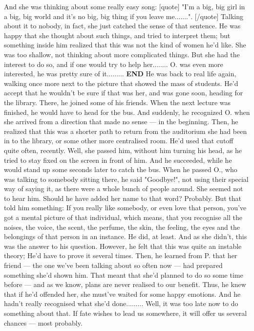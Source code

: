And she was thinking about some really easy song: 
[quote]
"I'm a big, big girl in a big, big world and it's no big, big thing if you leave me.......". 
[/quote]
Talking about it to nobody, in fact, she just catched the sense of that sentence. 
He was happy that she thought about such things, and tried to interpret them; but something inside him realized that this was not the kind of women he'd like. She was too shallow, not thinking about more complicated things. But she had the interest to do so, and if one would try to help her........
O. was even more interested, he was pretty sure of it.........
\textbf{END}
He was back to real life again, walking once more next to the picture that showed the mass of students. 
He'd accept that he wouldn't be sure if that was her, and was gone soon, heading for the library. There, he joined some of his friends. 
When the next lecture was finished, he would have to head for the bus. 
And suddenly, he recognized O. when she arrived from a direction that made no sense --- in the beginning. Then, he realized that this was a shorter path to return from the auditorium she had been in to the library, or some other more centralised room. 
He'd used that cutoff quite often, recently. 
Well, she passed him, without him turning his head, as he tried to stay fixed on the screen in front of him. 
And he succeeded, while he would stand up some seconds later to catch the bus. When he passed O., who was talking to somebody sitting there, he said "Goodbye!", not using their special way of saying it, as there were a whole bunch of people around. 
She seemed not to hear him. 
Should he have added her name to that word?
Probably. But that told him something: If you really like somebody, or even love that person, you've got a mental picture of that individual, which means, that you recognise all the noises, the voice, the scent, the perfume, the skin, the feeling, the eyes and the belongings of that person in an instance. 
He did, at least. 
And as she didn't, this was the answer to his question. 
However, he felt that this was quite an instable theory; He'd have to prove it several times. 
Then, he learned from P. that her friend --- the one we've been talking about so often now --- had prepared something she'd shown him. That meant that she'd planned to do so some time before --- and as we know, plans are never realised to our benefit. 
Thus, he knew that if he'd offended her, she must've waited for some happy emotions. And he hadn't really recognised what she'd done.........
Well, it was too late now to do something about that. If fate wishes to lead us somewhere, it will offer us several chances --- most probably. 
